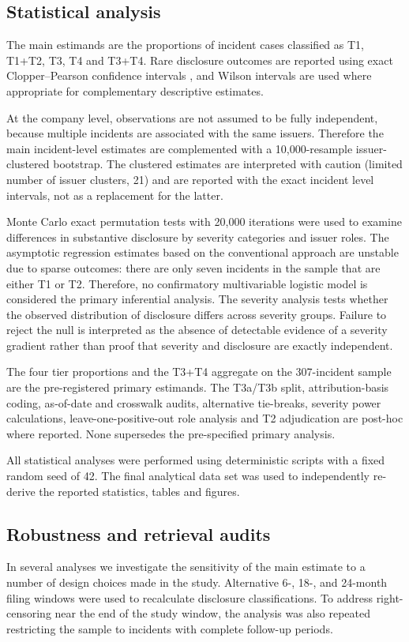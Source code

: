 \documentclass[utf8]{FrontiersinHarvard}
\begin{document}
\subsection{Statistical analysis}
The main estimands are the proportions of incident cases classified as T1, T1+T2, T3, T4 and T3+T4. Rare disclosure outcomes are reported using exact Clopper--Pearson confidence intervals \citep{ClopperPearson1934}, and Wilson intervals \citep{Wilson1927} are used where appropriate for complementary descriptive estimates.

At the company level, observations are not assumed to be fully independent, because multiple incidents are associated with the same issuers. Therefore the main incident-level estimates are complemented with a 10,000-resample issuer-clustered bootstrap. The clustered estimates are interpreted with caution (limited number of issuer clusters, 21) and are reported with the exact incident level intervals, not as a replacement for the latter.

Monte Carlo exact permutation tests with 20,000 iterations were used to examine differences in substantive disclosure by severity categories and issuer roles. The asymptotic regression estimates based on the conventional approach are unstable due to sparse outcomes: there are only seven incidents in the sample that are either T1 or T2. Therefore, no confirmatory multivariable logistic model is considered the primary inferential analysis. The severity analysis tests whether the observed distribution of disclosure differs across severity groups. Failure to reject the null is interpreted as the absence of detectable evidence of a severity gradient rather than proof that severity and disclosure are exactly independent.

The four tier proportions and the T3+T4 aggregate on the 307-incident sample are the pre-registered primary estimands. The T3a/T3b split, attribution-basis coding, as-of-date and crosswalk audits, alternative tie-breaks, severity power calculations, leave-one-positive-out role analysis and T2 adjudication are post-hoc where reported. None supersedes the pre-specified primary analysis.

All statistical analyses were performed using deterministic scripts with a fixed random seed of 42. The final analytical data set was used to independently re-derive the reported statistics, tables and figures.

\subsection{Robustness and retrieval audits}
In several analyses we investigate the sensitivity of the main estimate to a number of design choices made in the study. Alternative 6-, 18-, and 24-month filing windows were used to recalculate disclosure classifications. To address right-censoring near the end of the study window, the analysis was also repeated restricting the sample to incidents with complete follow-up periods.
\end{document}
